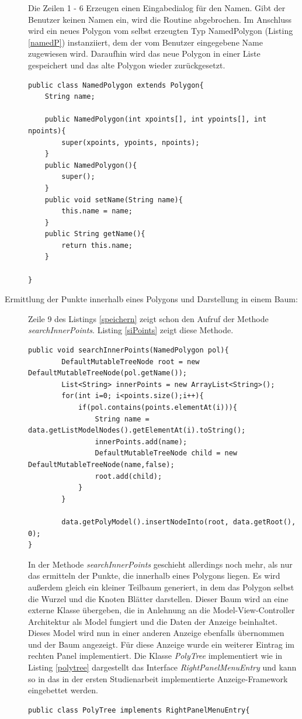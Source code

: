 \begin{description}
Die Zeilen 1 - 6 Erzeugen einen Eingabedialog für den Namen. Gibt der Benutzer keinen Namen ein, wird die Routine abgebrochen. Im Anschluss wird ein neues Polygon vom selbst erzeugten Typ NamedPolygon (Listing \ref{namedP}) instanziiert, dem der vom Benutzer eingegebene Name zugewiesen wird. Daraufhin wird das neue Polygon in einer Liste gespeichert und das alte Polygon wieder zurückgesetzt. 
\begin{lstlisting}[captionpos=b, caption=Klassendefinition des NamedPolygon, label=namedP]
public class NamedPolygon extends Polygon{
    String name;

    public NamedPolygon(int xpoints[], int ypoints[], int npoints){
        super(xpoints, ypoints, npoints);
    }
    public NamedPolygon(){
        super();
    }
    public void setName(String name){
        this.name = name;
    }
    public String getName(){
        return this.name;
    }

}
\end{lstlisting}

\item[Ermittlung der Punkte innerhalb eines Polygons und Darstellung in einem Baum:] Zeile 9 des Listings \ref{speichern} zeigt schon den Aufruf der Methode \emph{searchInnerPoints}. Listing \ref{siPoints} zeigt diese Methode.
\begin{lstlisting}[captionpos=b, caption=Methode searchInnerPoints, label=siPoints]
public void searchInnerPoints(NamedPolygon pol){
        DefaultMutableTreeNode root = new DefaultMutableTreeNode(pol.getName());
        List<String> innerPoints = new ArrayList<String>();
        for(int i=0; i<points.size();i++){
            if(pol.contains(points.elementAt(i))){
                String name = data.getListModelNodes().getElementAt(i).toString();
                innerPoints.add(name);
                DefaultMutableTreeNode child = new DefaultMutableTreeNode(name,false);
                root.add(child);
            }
        }
        
        data.getPolyModel().insertNodeInto(root, data.getRoot(), 0);
}
\end{lstlisting}

In der Methode \emph{searchInnerPoints} geschieht allerdings noch mehr, als nur das ermitteln der Punkte, die innerhalb eines Polygons liegen. Es wird außerdem gleich ein kleiner Teilbaum generiert, in dem das Polygon  selbst die Wurzel und die Knoten Blätter darstellen. Dieser Baum wird an eine externe Klasse übergeben, die in Anlehnung an die Model-View-Controller Architektur als Model fungiert und die Daten der Anzeige beinhaltet. Dieses Model wird nun in einer anderen Anzeige ebenfalls übernommen und der Baum angezeigt. Für diese Anzeige wurde ein weiterer Eintrag im rechten Panel implementiert. Die Klasse \emph{PolyTree} implementiert wie in Listing \ref{polytree} dargestellt das Interface \emph{RightPanelMenuEntry} und kann so in das in der ersten Studienarbeit implementierte Anzeige-Framework eingebettet werden.
\begin{lstlisting}[captionpos=b, caption=Klasse PolyTree, label=polytree]
public class PolyTree implements RightPanelMenuEntry{


\end{lstlisting}
\end{description}
